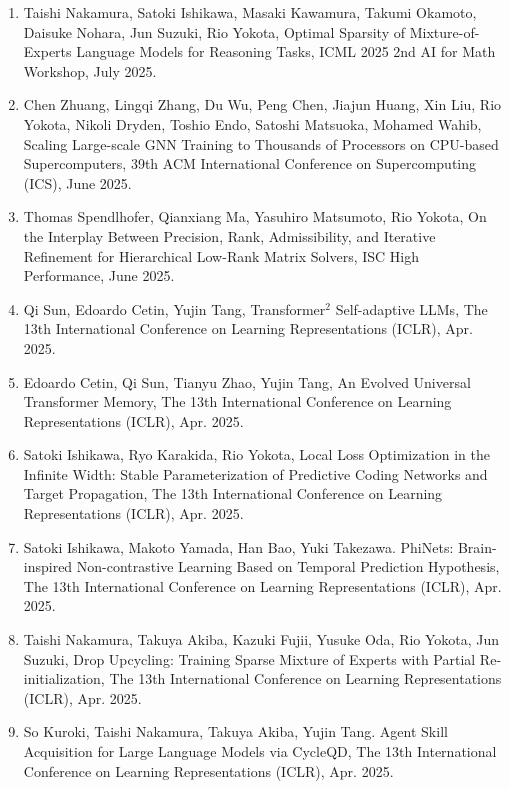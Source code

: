 \documentclass[margin,line]{cv}
\begin{document}
\begin{resume}
\begin{enumerate}
\item Taishi Nakamura, Satoki Ishikawa, Masaki Kawamura, Takumi Okamoto, Daisuke Nohara, Jun Suzuki, Rio Yokota, Optimal Sparsity of Mixture-of-Experts Language Models for Reasoning Tasks, ICML 2025 2nd AI for Math Workshop, July 2025.

\item Chen Zhuang, Lingqi Zhang, Du Wu, Peng Chen, Jiajun Huang, Xin Liu, Rio Yokota, Nikoli Dryden, Toshio Endo, Satoshi Matsuoka, Mohamed Wahib, Scaling Large-scale GNN Training to Thousands of Processors on CPU-based Supercomputers, 39th ACM International Conference on Supercomputing (ICS), June 2025.

\item Thomas Spendlhofer, Qianxiang Ma, Yasuhiro Matsumoto, Rio Yokota, On the Interplay Between Precision, Rank, Admissibility, and Iterative Refinement for Hierarchical Low-Rank Matrix Solvers, ISC High Performance, June 2025.

\item Qi Sun, Edoardo Cetin, Yujin Tang, Transformer$^2$ Self-adaptive LLMs, The 13th International Conference on Learning Representations (ICLR), Apr. 2025.

\item Edoardo Cetin, Qi Sun, Tianyu Zhao, Yujin Tang, An Evolved Universal Transformer Memory, The 13th International Conference on Learning Representations (ICLR), Apr. 2025.

\item Satoki Ishikawa, Ryo Karakida, Rio Yokota, Local Loss Optimization in the Infinite Width: Stable Parameterization of Predictive Coding Networks and Target Propagation, The 13th International Conference on Learning Representations (ICLR), Apr. 2025.

\item Satoki Ishikawa, Makoto Yamada, Han Bao, Yuki Takezawa. PhiNets: Brain-inspired Non-contrastive Learning Based on Temporal Prediction Hypothesis, The 13th International Conference on Learning Representations (ICLR), Apr. 2025.

\item Taishi Nakamura, Takuya Akiba, Kazuki Fujii, Yusuke Oda, Rio Yokota, Jun Suzuki, Drop Upcycling: Training Sparse Mixture of Experts with Partial Re-initialization, The 13th International Conference on Learning Representations (ICLR), Apr. 2025.

\item So Kuroki, Taishi Nakamura, Takuya Akiba, Yujin Tang. Agent Skill Acquisition for Large Language Models via CycleQD, The 13th International Conference on Learning Representations (ICLR), Apr. 2025.


\end{enumerate}
\end{resume}
\end{document}
